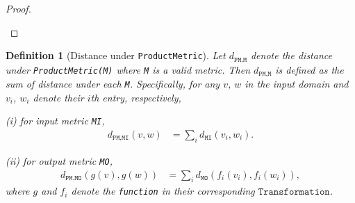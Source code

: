 \documentclass[11pt,a4paper]{article}
\newtheorem{definition}{Definition}
\begin{document}
\begin{proof}
\begin{enumerate}
   
\end{enumerate}
\end{proof}

    \begin{definition}[Distance under \texttt{ProductMetric}]\label{def:prodm}
     Let $d_{\texttt{PM,M}}$ denote the distance under \texttt{ProductMetric(M)} where \texttt{M} is a valid metric. Then $d_{\texttt{PM,M}}$ is defined as the sum of distance under each \texttt{M}. Specifically, for any $v$, $w$ in the input domain and $v_i$, $w_i$ denote their $i$th entry, respectively, 
     
     (i) for input metric \texttt{MI}, 
     \begin{equation*}
    \begin{aligned}
        d_{\texttt{PM,MI}}(v,w) &
        = \sum_{i} d_{\texttt{MI}}(v_i, w_i).
    \end{aligned}
    \end{equation*}
 
     (ii) for output metric \texttt{MO},
    \begin{equation*}
    \begin{aligned} 
        d_{\texttt{PM,MO}}(g(v), g(w)) &
        = \sum_{i} d_{\texttt{MO}}(f_i(v_i), f_i(w_i)),
    \end{aligned}
    \end{equation*} 
    where $g$ and $f_i$ denote the \texttt{function} in their corresponding $\texttt{Transformation}$.
    \end{definition}
    
\end{document}
